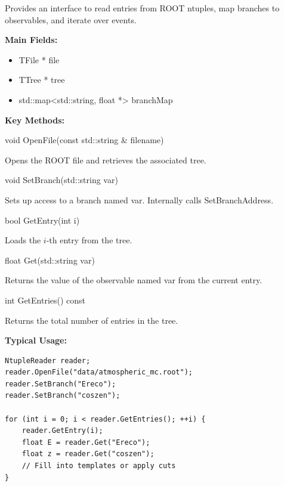 Provides an interface to read entries from ROOT ntuples, map branches to observables, and iterate over events.

\vspace{0.5em}
\noindent\textbf{Main Fields:}

\begin{itemize}
  \item {\color{amber}TFile *} file
  \item {\color{amber}TTree *} tree
  \item {\color{amber}std::map<std::string, float *>} branchMap
\end{itemize}

\vspace{0.5em}
\noindent\textbf{Key Methods:}

\begin{description}[align=left]

  \item[] {\color{cadmiumred} void OpenFile(const std::string \& filename)}

  Opens the ROOT file and retrieves the associated tree.

  \item[] {\color{cadmiumred} void SetBranch(std::string var)}

  Sets up access to a branch named {\color{amber}var}.  
  Internally calls {\color{cadmiumgreen} SetBranchAddress}.

  \item[] {\color{cadmiumred} bool GetEntry(int i)}

  Loads the $i$-th entry from the tree.

  \item[] {\color{cadmiumred} float Get(std::string var)}

  Returns the value of the observable named {\color{amber}var} from the current entry.

  \item[] {\color{cadmiumred} int GetEntries() const}

  Returns the total number of entries in the tree.

\end{description}

\vspace{0.5em}
\noindent\textbf{Typical Usage:}

\begin{lstlisting}
NtupleReader reader;
reader.OpenFile("data/atmospheric_mc.root");
reader.SetBranch("Ereco");
reader.SetBranch("coszen");

for (int i = 0; i < reader.GetEntries(); ++i) {
    reader.GetEntry(i);
    float E = reader.Get("Ereco");
    float z = reader.Get("coszen");
    // Fill into templates or apply cuts
}
\end{lstlisting}

